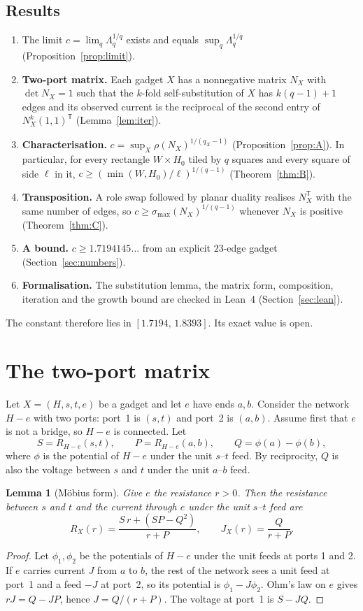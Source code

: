 \documentclass[11pt]{amsart}
\theoremstyle{plain}
\newtheorem{lemma}[theorem]{Lemma}
\theoremstyle{definition}
\theoremstyle{remark}
\newcommand{\T}{\mathsf{T}}
\newcommand{\Lam}{\Lambda}
\begin{document}
\subsection*{Results}
\begin{enumerate}
\item The limit $c=\lim_q\Lam_q^{1/q}$ exists and equals $\sup_q\Lam_q^{1/q}$ (Proposition~\ref{prop:limit}).
\item \textbf{Two-port matrix.} Each gadget $X$ has a nonnegative matrix $N_X$ with $\det N_X=1$ such that the
  $k$-fold self-substitution of $X$ has $k(q-1)+1$ edges and its observed current is the reciprocal of the second
  entry of $N_X^k(1,1)^{\T}$ (Lemma~\ref{lem:iter}).
\item \textbf{Characterisation.} $c=\sup_X\rho(N_X)^{1/(q_X-1)}$ (Proposition~\ref{prop:A}). In particular, for
  every rectangle $W\times H_0$ tiled by $q$ squares and every square of side $\ell$ in it,
  $c\ge(\min(W,H_0)/\ell)^{1/(q-1)}$ (Theorem~\ref{thm:B}).
\item \textbf{Transposition.} A role swap followed by planar duality realises $N_X^{\T}$ with the same number of
  edges, so $c\ge\sigma_{\max}(N_X)^{1/(q-1)}$ whenever $N_X$ is positive (Theorem~\ref{thm:C}).
\item \textbf{A bound.} $c\ge1.7194145\ldots$ from an explicit $23$-edge gadget (Section~\ref{sec:numbers}).
\item \textbf{Formalisation.} The substitution lemma, the matrix form, composition, iteration and the growth bound
  are checked in Lean~4 (Section~\ref{sec:lean}).
\end{enumerate}
The constant therefore lies in $[1.7194,\,1.8393]$. Its exact value is open.

\section{The two-port matrix}\label{sec:matrix}

Let $X=(H,s,t,e)$ be a gadget and let $e$ have ends $a,b$. Consider the network $H-e$ with two ports: port~1 is
$(s,t)$ and port~2 is $(a,b)$. Assume first that $e$ is not a bridge, so $H-e$ is connected. Let
\[
S=R_{H-e}(s,t),\qquad P=R_{H-e}(a,b),\qquad Q=\phi(a)-\phi(b),
\]
where $\phi$ is the potential of $H-e$ under the unit $s$--$t$ feed. By reciprocity, $Q$ is also the voltage
between $s$ and $t$ under the unit $a$--$b$ feed.

\begin{lemma}[M\"obius form]\label{lem:mobius}
Give $e$ the resistance $r>0$. Then the resistance between $s$ and $t$ and the current through $e$ under the unit
$s$--$t$ feed are
\[
R_X(r)=\frac{S\,r+(SP-Q^2)}{r+P},\qquad J_X(r)=\frac{Q}{r+P}.
\]
\end{lemma}
\begin{proof}
Let $\phi_1,\phi_2$ be the potentials of $H-e$ under the unit feeds at ports 1 and 2. If $e$ carries current $J$
from $a$ to $b$, the rest of the network sees a unit feed at port~1 and a feed $-J$ at port~2, so its potential is
$\phi_1-J\phi_2$. Ohm's law on $e$ gives $rJ=Q-JP$, hence $J=Q/(r+P)$. The voltage at port~1 is $S-JQ$.
\end{proof}
\end{document}
